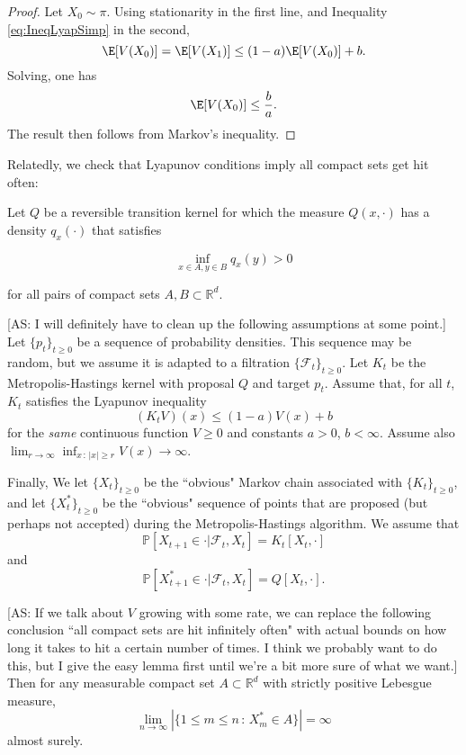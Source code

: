 \begin{proof}
  Let $X_{0} \sim \pi$. Using stationarity in the first line, and Inequality \eqref{eq:IneqLyapSimp} in the second, $$\E[V(X_{0})] = \E[V(X_{1})] \leq (1 - a) \E[V(X_{0})] + b.$$  Solving, one has $$\E[V(X_{0})] \leq \frac{b}{a}.$$  The result then follows from Markov's inequality.
\end{proof}

Relatedly, we check that Lyapunov conditions imply all compact sets get hit often:

\begin{lemma}

Let $Q$ be a reversible transition kernel for which the measure $Q(x,\cdot)$ has a density $q_{x}(\cdot)$ that satisfies

\begin{equation}
\inf_{x \in A, y \in B} q_{x}(y) > 0
\label{eq:IneqMinComp}
\end{equation}

\noindent for all pairs of compact sets $A,B \subset \mathbb{R}^{d}$.

[AS: I will definitely have to clean up the following assumptions at some point.]
Let $\{p_{t}\}_{t \geq 0}$ be a sequence of probability densities. This sequence may be random, but we assume it is adapted to a filtration $\{ \mathcal{F}_{t} \}_{t \geq 0}$. Let $K_{t}$ be the Metropolis-Hastings kernel with proposal $Q$ and target $p_{t}$. Assume that, for all $t$, $K_{t}$ satisfies the Lyapunov inequality $$(K_{t}V)(x) \leq (1-a) V(x) + b$$
for the \textit{same} continuous function $V \geq 0$ and constants $a> 0$, $b <\infty$. Assume also $\lim_{r \rightarrow \infty} \inf_{x \, : \, |x| \geq r}V(x) \rightarrow \infty$.

Finally, We let $\{X_{t}\}_{t \geq 0}$ be the ``obvious" Markov chain associated with $\{K_{t}\}_{t \geq 0}$, and let $\{X_{t}^{\ast} \}_{t \geq 0}$ be the ``obvious" sequence of points that are proposed (but perhaps not accepted) during the Metropolis-Hastings algorithm. We assume that $$\mathbb{P}[X_{t+1} \in \cdot | \mathcal{F}_{t}, X_{t}] = K_{t}[X_{t},\cdot]$$
and $$\mathbb{P}[X_{t+1}^{\ast} \in \cdot | \mathcal{F}_{t}, X_{t}] = Q[X_{t},\cdot].$$

[AS: If we talk about $V$ growing with some rate, we can replace the following conclusion ``all compact sets are hit infinitely often" with actual bounds on how long it takes to hit a certain number of times. I think we probably want to do this, but I give the easy lemma first until we're a bit more sure of what we want.] Then for any measurable compact set $A \subset \mathbb{R}^{d}$ with strictly positive Lebesgue measure,
\[
\lim_{n \rightarrow \infty} |\{1 \leq m \leq n \, : \, X_{m}^{\ast} \in A\}| = \infty
\]
almost surely.

\end{lemma}

